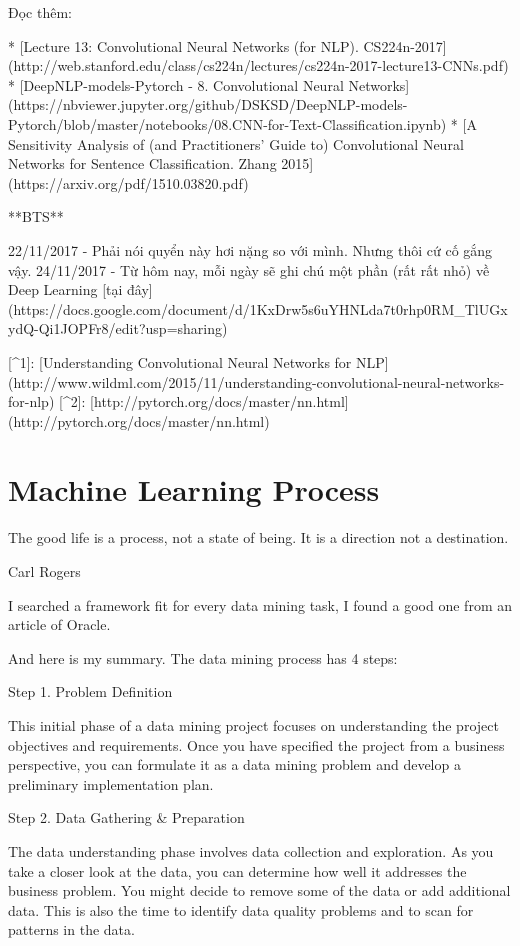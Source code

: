 Đọc thêm:

* [Lecture 13: Convolutional Neural Networks (for NLP). CS224n-2017](http://web.stanford.edu/class/cs224n/lectures/cs224n-2017-lecture13-CNNs.pdf)
* [DeepNLP-models-Pytorch - 8. Convolutional Neural Networks](https://nbviewer.jupyter.org/github/DSKSD/DeepNLP-models-Pytorch/blob/master/notebooks/08.CNN-for-Text-Classification.ipynb)
* [A Sensitivity Analysis of (and Practitioners’ Guide to) Convolutional Neural Networks for Sentence Classification. Zhang 2015](https://arxiv.org/pdf/1510.03820.pdf)

**BTS**

22/11/2017 - Phải nói quyển này hơi nặng so với mình. Nhưng thôi cứ cố gắng vậy.
24/11/2017 - Từ hôm nay, mỗi ngày sẽ ghi chú một phần (rất rất nhỏ) về Deep Learning [tại đây](https://docs.google.com/document/d/1KxDrw5s6uYHNLda7t0rhp0RM_TlUGxydQ-Qi1JOPFr8/edit?usp=sharing)

[^1]: [Understanding Convolutional Neural Networks for NLP](http://www.wildml.com/2015/11/understanding-convolutional-neural-networks-for-nlp)
[^2]: [http://pytorch.org/docs/master/nn.html](http://pytorch.org/docs/master/nn.html)

\section{Machine Learning Process}

The good life is a process, not a state of being. It is a direction not a destination.

Carl Rogers


I searched a framework fit for every data mining task, I found a good one from an article of Oracle.

And here is my summary. The data mining process has 4 steps:

Step 1. Problem Definition

This initial phase of a data mining project focuses on understanding the project objectives and requirements. Once you have specified the project from a business perspective, you can formulate it as a data mining problem and develop a preliminary implementation plan.

Step 2. Data Gathering & Preparation

The data understanding phase involves data collection and exploration. As you take a closer look at the data, you can determine how well it addresses the business problem. You might decide to remove some of the data or add additional data. This is also the time to identify data quality problems and to scan for patterns in the data.

